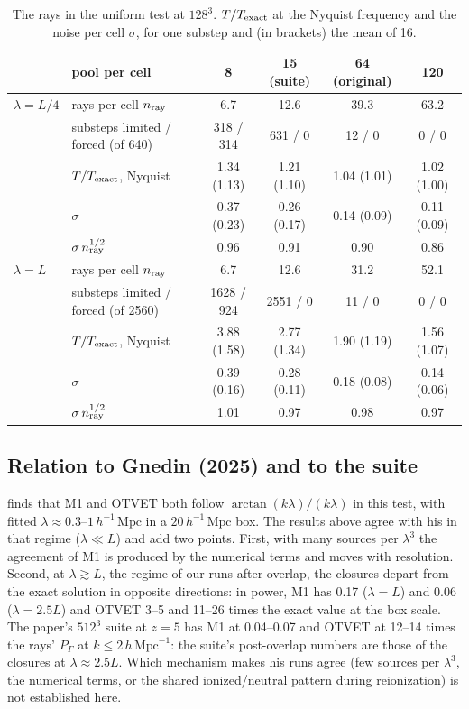 \documentclass[11pt]{article}
\newcommand{\hmpc}{\,h\,\mathrm{Mpc}^{-1}}
\newcommand{\mpch}{\,h^{-1}\,\mathrm{Mpc}}
\begin{document}
\begin{table}
\centering
\caption{The rays in the uniform test at $128^3$. $T/T_{\rm exact}$ at the Nyquist frequency and the noise
per cell $\sigma$, for one substep and (in brackets) the mean of 16.}
\label{tab:raytest}
\begin{tabular}{llcccc}
\toprule
 & pool per cell & 8 & 15 (suite) & 64 (original) & 120\\
\midrule
$\lambda=L/4$ & rays per cell $n_{\rm ray}$ & 6.7 & 12.6 & 39.3 & 63.2\\
 & substeps limited / forced (of 640) & 318 / 314 & 631 / 0 & 12 / 0 & 0 / 0\\
 & $T/T_{\rm exact}$, Nyquist & 1.34 (1.13) & 1.21 (1.10) & 1.04 (1.01) & 1.02 (1.00)\\
 & $\sigma$ & 0.37 (0.23) & 0.26 (0.17) & 0.14 (0.09) & 0.11 (0.09)\\
 & $\sigma\,n_{\rm ray}^{1/2}$ & 0.96 & 0.91 & 0.90 & 0.86\\
\midrule
$\lambda=L$ & rays per cell $n_{\rm ray}$ & 6.7 & 12.6 & 31.2 & 52.1\\
 & substeps limited / forced (of 2560) & 1628 / 924 & 2551 / 0 & 11 / 0 & 0 / 0\\
 & $T/T_{\rm exact}$, Nyquist & 3.88 (1.58) & 2.77 (1.34) & 1.90 (1.19) & 1.56 (1.07)\\
 & $\sigma$ & 0.39 (0.16) & 0.28 (0.11) & 0.18 (0.08) & 0.14 (0.06)\\
 & $\sigma\,n_{\rm ray}^{1/2}$ & 1.01 & 0.97 & 0.98 & 0.97\\
\bottomrule
\end{tabular}
\end{table}

\subsection{Relation to Gnedin (2025) and to the suite}

\citet{gnedin25} finds that M1 and OTVET both follow $\arctan(k\lambda)/(k\lambda)$ in this test, with fitted
$\lambda\approx0.3$--$1\mpch$ in a $20\mpch$ box. The results above agree with his in that regime ($\lambda\ll L$)
and add two points. First, with many sources per $\lambda^3$ the agreement of M1 is produced by the numerical terms
and moves with resolution. Second, at $\lambda\gtrsim L$, the regime of our runs after overlap, the
closures depart from the exact solution in opposite directions: in power, M1 has 0.17 ($\lambda=L$) and 0.06
($\lambda=2.5L$) and OTVET 3--5 and 11--26 times the exact value at the box scale. The paper's $512^3$ suite at
$z=5$ has M1 at 0.04--0.07 and OTVET at 12--14 times the rays' $P_\Gamma$ at $k\le2\hmpc$: the suite's
post-overlap numbers are those of the closures at $\lambda\approx2.5L$. Which mechanism makes his runs agree
(few sources per $\lambda^3$, the numerical terms, or the shared ionized/neutral pattern during reionization)
is not established here.
\end{document}
